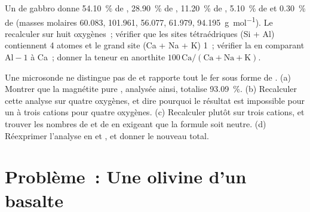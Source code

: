 \begin{exercise}[$\star\star\star$]\label{exo:b1:rock-forming-minerals:11}
Un  de gabbro donne \qty{54.10}{\percent} de ,
\qty{28.90}{\percent} de , \qty{11.20}{\percent} de ,
\qty{5.10}{\percent} de  et \qty{0.30}{\percent} de  (masses
molaires \num{60.083}, \num{101.961}, \num{56.077}, \num{61.979},
\qty{94.195}{g.mol^{-1}}). Le recalculer sur huit oxygènes~; vérifier que les
sites tétraédriques (Si + Al) contiennent 4 atomes et le grand site
(Ca + Na + K) 1~; vérifier la  en comparant $\mathrm{Al} - 1$
à Ca~; donner la teneur en anorthite $100\,\mathrm{Ca}/(\mathrm{Ca} +
\mathrm{Na} + \mathrm{K})$.
\end{exercise}

\begin{exercise}[$\star\star\star$]\label{exo:b1:rock-forming-minerals:12}
Une microsonde ne distingue pas  de  et rapporte tout le
fer sous forme de . (a) Montrer que la magnétite pure , analysée
ainsi, totalise \qty{93.09}{\percent}. (b) Recalculer cette analyse sur quatre
oxygènes, et dire pourquoi le résultat est impossible pour un  à trois
cations pour quatre oxygènes. (c) Recalculer plutôt sur trois cations, et trouver
les nombres de  et de  en exigeant que la formule soit
neutre. (d) Réexprimer l'analyse en  et , et donner le nouveau
total.
\end{exercise}

\section{Problème~: Une olivine d'un basalte}

